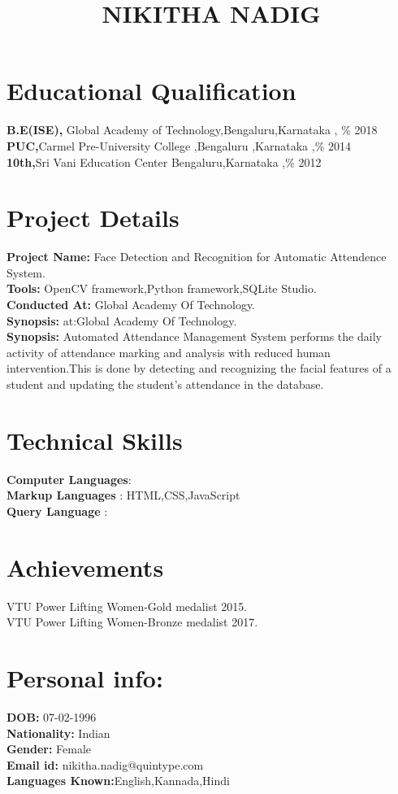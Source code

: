 \documentclass[12pt,oneside,a4paper]{article}
\begin{document}
	\title {\bf NIKITHA NADIG}\author {}
	\date{}
	\maketitle
\section*{Educational Qualification}
{\bf B.E(ISE)\thinspace,} Global Academy of Technology\thinspace,\thinspace Bengaluru\thinspace,\thinspace Karnataka \thinspace , \% \hfill 2018
\\ {\bf PUC\thinspace,}\thinspace \thinspace \thinspace  Carmel Pre-University College ,\thinspace Bengaluru ,\thinspace Karnataka \thinspace,\% \thinspace  \thinspace \thinspace \thinspace \thinspace \hfill 2014
\\ {\bf 10th\thinspace,}\thinspace \thinspace \thinspace  Sri Vani Education Center \thinspace \thinspace Bengaluru\thinspace,\thinspace Karnataka ,\% \thinspace  \thinspace \thinspace \thinspace \thinspace \hfill 2012
\section*{Project Details}
{\bf Project Name:} Face Detection and Recognition for Automatic Attendence System.
\\ {\bf Tools:} OpenCV framework,Python framework,SQLite Studio.
\\ {\bf Conducted At:} Global Academy Of Technology.
\\ {\bf Synopsis:} at:Global Academy Of Technology.
\\ {\bf Synopsis:} Automated Attendance Management System performs the daily activity of attendance marking and analysis with reduced human intervention.This is done by detecting and recognizing the facial features of a student and updating the student's attendance in the database.
\section*{Technical Skills}
{\bf Computer Languages}\thinspace \thinspace:\thinspace{}
\\{\bf Markup Languages} \thinspace\thinspace: \thinspace\thinspace HTML,CSS,JavaScript\thinspace
\\{\bf Query Language} \thinspace\thinspace :\thinspace{}

\section*{Achievements}
{VTU Power Lifting Women-Gold medalist 2015.}
\\ {VTU Power Lifting Women-Bronze medalist 2017.}

\section*{Personal info:}
 {\bf DOB: }07-02-1996
\\ {\bf Nationality: }Indian
\\ {\bf Gender: }Female
\\ {\bf Email id: }nikitha.nadig@quintype.com\\
{\bf Languages Known:}English,Kannada,Hindi\\ 
\end{document}
